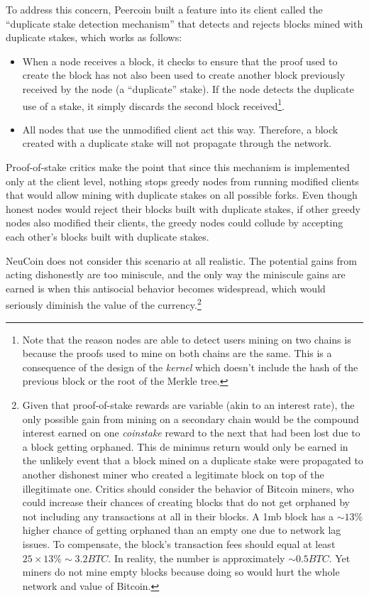 \documentclass[a4paper,11pt]{article}
\begin{document}
To address this concern, Peercoin built a feature into its client called the ``duplicate stake detection mechanism'' that detects and rejects blocks mined with duplicate stakes, which works as follows:
\begin{itemize}
\item{When a node receives a block, it checks to ensure that the proof used to create the block has not also been used to create another block previously received by the node (a ``duplicate'' stake). If the node detects the duplicate use of a stake, it simply discards the second block received\footnote{ Note that the reason nodes are able to detect users mining on two chains is because the proofs used to mine on both chains are the same. This is a consequence of the design of the \textit{kernel} which doesn't include the hash of the previous block or the root of the Merkle tree. }.}
\item{All nodes that use the unmodified client act this way. Therefore, a block created with a duplicate stake will not propagate through the network.}
\end{itemize}

Proof-of-stake critics make the point that since this mechanism is implemented only at the client level, nothing stops greedy nodes from running modified clients that would allow mining with duplicate stakes on all possible forks. Even though honest nodes would reject their blocks built with duplicate stakes, if other greedy nodes also modified their clients, the greedy nodes could collude by accepting each other's blocks built with duplicate stakes. 

NeuCoin does not consider this scenario at all realistic. The potential gains from acting dishonestly are too miniscule, and the only way the miniscule gains are earned is when this antisocial behavior becomes widespread, which would seriously diminish the value of the currency.\footnote{Given that proof-of-stake rewards are variable (akin to an interest rate), the only possible gain from mining on a secondary chain would be the compound interest earned on one \textit{coinstake} reward to the next that had been lost due to a block getting orphaned. This de minimus return would only be earned in the unlikely event that a block mined on a duplicate stake were propagated to another dishonest miner who created a legitimate block on top of the illegitimate one. Critics should consider the behavior of Bitcoin miners, who could increase their chances of creating blocks that do not get orphaned by not including any transactions at all in their blocks. A 1mb block has a $\sim13\%$ higher chance of getting orphaned than an empty one due to network lag issues\cite{gavintx}. To compensate, the block's transaction fees should equal at least $25\times13\%\sim3.2BTC$. In reality, the number is approximately $\sim 0.5 BTC$. Yet miners do not mine empty blocks because doing so would hurt the whole network and value of Bitcoin. }
\end{document}
